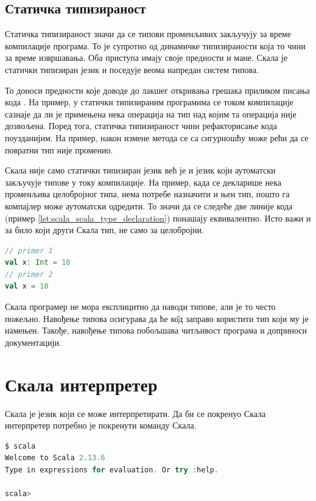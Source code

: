 \documentclass[12pt,oneside]{memoir}
\begin{document}
\subsection{Статичка типизираност}
\label{subsec:scala_stat_tip}

Статичка типизираност значи да се типови променљивих закључују за време компилације програма. То је супротно од динамичке типизираности која то чини за време извршавања. Оба приступа имају своје предности и мане. Скала је статички типизиран језик и поседује веома напредан систем типова.

То доноси предности које доводе до лакшег откривања грешака приликом писања кода \cite{scala_prog}. На пример, у статички типизираним програмима се током компилације сазнаје да ли је примењена нека операција на тип над којим та операција није дозвољена. Поред тога, статичка типизираност чини рефакторисање кода поузданијим. На пример, након измене метода се са сигурношћу може рећи да се повратни тип није променио.

Скала није само статички типизиран језик већ је и језик који аутоматски закључује типове у току компилације. На пример, када се декларише нека променљива целобројног типа, нема потребе назначити и њен тип, пошто га компајлер може аутоматски одредити. То значи да се следеће две линије кода (пример \ref{lst:scala_scala_type_declaration}) понашају еквивалентно. Исто важи и за било који други Скала тип, не само за целобројни.

\begin{lstlisting}[caption={Декларација променљиве са и без експлицитног навођења типа}, language=Scala, label={lst:scala_scala_type_declaration}]
// primer 1
val x: Int = 10
// primer 2
val x = 10
\end{lstlisting}

Скала програмер не мора експлицитно да наводи типове, али је то  често пожељно. Навођење типова осигурава да ће к\^{о}д заправо користити тип који му је намењен. Такође, навођење типова побољшава читљивост програма и доприноси документацији.

\section{Скала интерпретер}
\label{sec:scala_interpr}

Скала је језик који се може интерпретирати. Да би се покренуо Скала интерпретер потребно је покренути команду Скала.

\begin{lstlisting}[language=Scala, caption={Скала интерпретер}, label={lst:scala_scala_interpreter_example}]
$ scala
Welcome to Scala 2.13.6
Type in expressions for evaluation. Or try :help.

scala>
\end{lstlisting}
\end{document}

